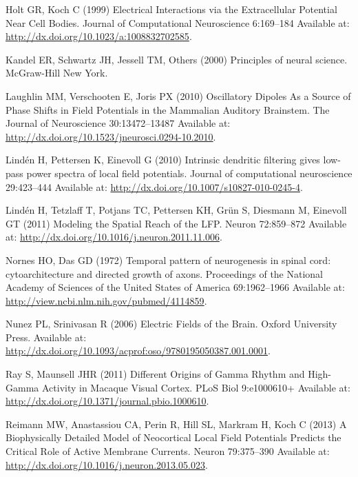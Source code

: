 \documentclass[]{article}
\begin{document}
\hypertarget{ref-Holt1999Electrical}{}
Holt GR, Koch C (1999) Electrical Interactions via the Extracellular
Potential Near Cell Bodies. Journal of Computational Neuroscience
6:169--184 Available at:
\url{http://dx.doi.org/10.1023/a:1008832702585}.

\hypertarget{ref-kandel2000principles}{}
Kandel ER, Schwartz JH, Jessell TM, Others (2000) Principles of neural
science. McGraw-Hill New York.

\hypertarget{ref-Laughlin2010Oscillatory}{}
Laughlin MM, Verschooten E, Joris PX (2010) Oscillatory Dipoles As a
Source of Phase Shifts in Field Potentials in the Mammalian Auditory
Brainstem. The Journal of Neuroscience 30:13472--13487 Available at:
\url{http://dx.doi.org/10.1523/jneurosci.0294-10.2010}.

\hypertarget{ref-Linden2010Intrinsic}{}
Lindén H, Pettersen K, Einevoll G (2010) Intrinsic dendritic filtering
gives low-pass power spectra of local field potentials. Journal of
computational neuroscience 29:423--444 Available at:
\url{http://dx.doi.org/10.1007/s10827-010-0245-4}.

\hypertarget{ref-Linden2011Modeling}{}
Lindén H, Tetzlaff T, Potjans TC, Pettersen KH, Grün S, Diesmann M,
Einevoll GT (2011) Modeling the Spatial Reach of the LFP. Neuron
72:859--872 Available at:
\url{http://dx.doi.org/10.1016/j.neuron.2011.11.006}.

\hypertarget{ref-Nornes1972Temporal}{}
Nornes HO, Das GD (1972) Temporal pattern of neurogenesis in spinal
cord: cytoarchitecture and directed growth of axons. Proceedings of the
National Academy of Sciences of the United States of America
69:1962--1966 Available at:
\url{http://view.ncbi.nlm.nih.gov/pubmed/4114859}.

\hypertarget{ref-Nunez2006Electric}{}
Nunez PL, Srinivasan R (2006) Electric Fields of the Brain. Oxford
University Press. Available at:
\url{http://dx.doi.org/10.1093/acprof:oso/9780195050387.001.0001}.

\hypertarget{ref-Ray2011Different}{}
Ray S, Maunsell JHR (2011) Different Origins of Gamma Rhythm and
High-Gamma Activity in Macaque Visual Cortex. PLoS Biol 9:e1000610+
Available at: \url{http://dx.doi.org/10.1371/journal.pbio.1000610}.

\hypertarget{ref-Reimann2013Biophysically}{}
Reimann MW, Anastassiou CA, Perin R, Hill SL, Markram H, Koch C (2013) A
Biophysically Detailed Model of Neocortical Local Field Potentials
Predicts the Critical Role of Active Membrane Currents. Neuron
79:375--390 Available at:
\url{http://dx.doi.org/10.1016/j.neuron.2013.05.023}.
\end{document}
